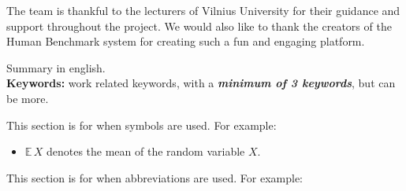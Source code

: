 \documentclass[]{VUMIFTemplateClass}
\newcommand{\EE}{\mathbb{E}\,} %
\begin{document}

\onehalfspacing


The team is thankful to the lecturers of Vilnius University for their guidance and support throughout the project. We would also like to thank the creators of the Human Benchmark system for creating such a fun and engaging platform.




Summary in english.\\

\textbf{Keywords:} work related keywords, with a \textit{\textbf{minimum of 3 keywords}}, but can be more.







\singlespacing
{}
\listoffigures 

\listoftables

\tableofcontents
\onehalfspacing


This section is for when symbols are used. For example:
\begin{itemize}
    \item $\EE X$ denotes the mean of the random variable $X$.
\end{itemize}


This section is for when abbreviations are used. For example:
\end{document}
